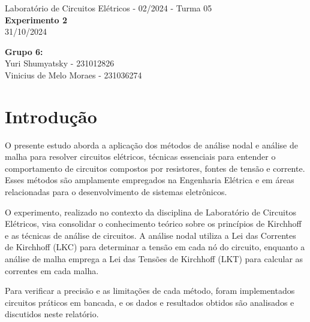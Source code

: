 \documentclass[a4 paper]{article}
\newcommand{\parag}{\hspace{30pt}}
\begin{document}
\justifying
\begin{center}{\large Laboratório de Circuitos Elétricos - 02/2024 - Turma 05}\\
{\large \textbf{Experimento 2}}\\ 
31/10/2024
\end{center}

\vspace{500pt}
 \noindent\textbf{Grupo 6:}\\
 Yuri Shumyatsky - 231012826\\
Vinicius de Melo Moraes - 231036274


\vspace{30pt}
\newpage

\section{Introdução}
\parag O presente estudo aborda a aplicação dos métodos de análise nodal e análise de malha para resolver circuitos elétricos, técnicas essenciais para entender o comportamento de circuitos compostos por resistores, fontes de tensão e corrente. Esses métodos são amplamente empregados na Engenharia Elétrica e em áreas relacionadas para o desenvolvimento de sistemas eletrônicos.

O experimento, realizado no contexto da disciplina de Laboratório de Circuitos Elétricos, visa consolidar o conhecimento teórico sobre os princípios de Kirchhoff e as técnicas de análise de circuitos. A análise nodal utiliza a Lei das Correntes de Kirchhoff (LKC) para determinar a tensão em cada nó do circuito, enquanto a análise de malha emprega a Lei das Tensões de Kirchhoff (LKT) para calcular as correntes em cada malha.

Para verificar a precisão e as limitações de cada método, foram implementados circuitos práticos em bancada, e os dados e resultados obtidos são analisados e discutidos neste relatório.
\end{document}
